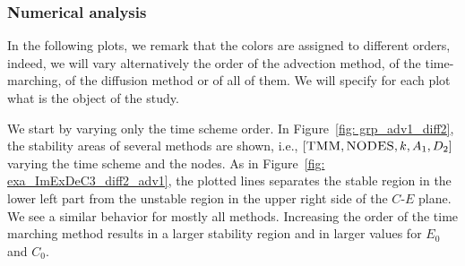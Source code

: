 \subsubsection{Numerical analysis}
In the following plots, we remark that the colors are assigned to different orders, indeed, we will vary alternatively the order of the advection method, of the time-marching, of the diffusion method or of all of them. We will specify for each plot what is the object of the study.

We start by varying only the time scheme order. 
In Figure~\ref{fig: grp_adv1_diff2}, the stability areas of several methods are shown, i.e., $[\textsc{TMM},\textsc{NODES},k, A_1,D_2]$ varying the time scheme and the nodes. 
As in Figure~\ref{fig: exa_ImExDeC3_diff2_adv1}, the plotted lines separates the stable region in the lower left part from the unstable region in the upper right side of the $C$-$E$ plane. 
We see a similar behavior for mostly all methods. 
Increasing the order of the time marching method results in a larger stability region and in larger values for $E_0$ and $C_0$. 

